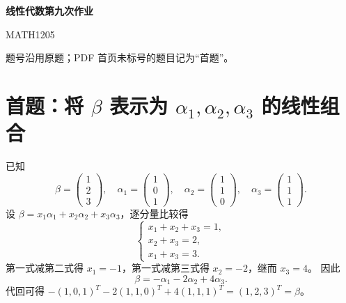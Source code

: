 \documentclass[11pt,a4paper,fontset=fandol]{ctexart}
\newcommand{\ans}[1]{\boxed{#1}}
\newcommand{\problem}[1]{\Needspace{7\baselineskip}\section*{#1}}
\begin{document}
\setlength{\abovedisplayskip}{6pt plus 2pt minus 2pt}
\setlength{\belowdisplayskip}{6pt plus 2pt minus 2pt}
\setlength{\abovedisplayshortskip}{3pt plus 1pt minus 1pt}
\setlength{\belowdisplayshortskip}{3pt plus 1pt minus 1pt}
\begin{center}
{\LARGE\bfseries 线性代数第九次作业}\par
\vspace{0.3em}
{\small MATH1205}
\end{center}
\vspace{-0.4em}
题号沿用原题；PDF 首页未标号的题目记为“首题”。

\problem{首题：将 $\beta$ 表示为 $\alpha_1,\alpha_2,\alpha_3$ 的线性组合}
已知
\[
\beta=\begin{pmatrix}1\\2\\3\end{pmatrix},\quad
\alpha_1=\begin{pmatrix}1\\0\\1\end{pmatrix},\quad
\alpha_2=\begin{pmatrix}1\\1\\0\end{pmatrix},\quad
\alpha_3=\begin{pmatrix}1\\1\\1\end{pmatrix}.
\]
设 $\beta=x_1\alpha_1+x_2\alpha_2+x_3\alpha_3$，逐分量比较得
\[
\begin{cases}
x_1+x_2+x_3=1,\\
x_2+x_3=2,\\
x_1+x_3=3.
\end{cases}
\]
第一式减第二式得 $x_1=-1$，第一式减第三式得 $x_2=-2$，继而 $x_3=4$。
因此
\[
\ans{\beta=-\alpha_1-2\alpha_2+4\alpha_3}.
\]
代回可得 $-(1,0,1)^T-2(1,1,0)^T+4(1,1,1)^T=(1,2,3)^T=\beta$。
\end{document}
